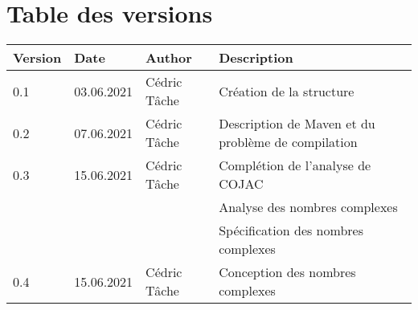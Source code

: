 \documentclass[french,11pt]{report}
\begin{document}



\section *{Table des versions}
\vspace*{0.5 cm}

\begin{table}[h]
    \begin{tabularx}{\columnwidth}{ | p{3.5em} |p{7em} | p{6.5em} | X |}
        \hline
        \textbf{Version} & \textbf{Date} & \textbf{Author} & \textbf{Description} \\
        \hline
        0.1 & 03.06.2021 & Cédric Tâche & Création de la structure \\
        0.2 & 07.06.2021 & Cédric Tâche & Description de Maven et du problème de compilation \\
        0.3 & 15.06.2021 & Cédric Tâche & Complétion de l'analyse de COJAC \\
         & & & Analyse des nombres complexes \\
         & & & Spécification des nombres complexes \\
        0.4 & 15.06.2021 & Cédric Tâche & Conception des nombres complexes \\
        \hline
    \end{tabularx}
\end{table}

\newpage


\hypersetup{
	hidelinks,
	allcolors=black,
	linktocpage,
	linktoc=all
}
\tableofcontents
\newpage




\end{document}

